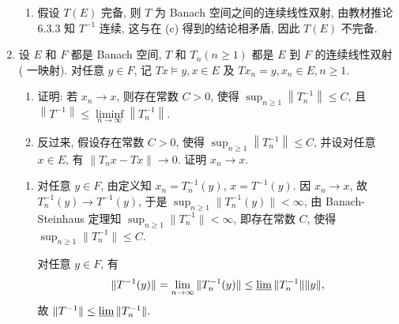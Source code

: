 \begin{enumerate}
\begin{answer}
\begin{enumerate}
        \item 假设 $T(E)$ 完备, 则 $T$ 为 Banach 空间之间的连续线性双射, 由教材推论 6.3.3
        知 $T^{-1}$ 连续, 这与在 (c) 得到的结论相矛盾, 因此 $T(E)$ 不完备.
      \end{enumerate}
    \end{answer}
  \item 设 $E$ 和 $F$ 都是 Banach 空间, $T$ 和 $T_{n}(n \geq 1)$ 都是 $E$ 到 $F$ 的连续线性双射 ( 一映射). 对任意 $y \in F$, 记 $T x \models y, x \in E$ 及 $T x_{n}=y, x_{n} \in E, n \geq 1$.
    \begin{enumerate}
      \item 证明: 若 $x_{n} \rightarrow x$, 则存在常数 $C>0$, 使得 $\sup _{n \geq 1}\left\|T_{n}^{-1}\right\| \leq C$, 且 $\left\|T^{-1}\right\| \leq \liminf\limits_{n \rightarrow \infty}\left\|T_{n}^{-1}\right\| .$
      \item 反过来, 假设存在常数 $C>0$, 使得 $\sup _{n \geq 1}\left\|T_{n}^{-1}\right\| \leq C$, 并设对任意 $x \in E$, 有 $\left\|T_{n} x-T x\right\| \rightarrow 0$. 证明 $x_{n} \rightarrow x$.
    \end{enumerate}
    \begin{answer}
      \begin{enumerate}
        \item 对任意 $y\in F$, 由定义知 $x_n=T_n^{-1}(y)$, $x=T^{-1}(y)$.
        因 $x_n\to x$, 故 $T_n^{-1}(y)\to T^{-1}(y)$, 于是 $\sup_{n\geq 1}\|T_n^{-1}(y)\|<\infty$,
        由 Banach-Steinhaus 定理知 $\sup_{n\geq 1}\|T_n^{-1}\|<\infty$,
        即存在常数 $C$, 使得 $\sup_{n\geq 1}\|T_n^{-1}\|\leq C$.
    
        对任意 $y\in F$, 有
        \[\|T^{-1}(y)\|=\lim_{n\to\infty}\|T_n^{-1}(y)\|\leq\varliminf\|T_n^{-1}\|\|y\|,\]
        故 $\|T^{-1}\|\leq\varliminf\|T_n^{-1}\|$.
    

\end{enumerate}
\end{answer}
\end{enumerate}
